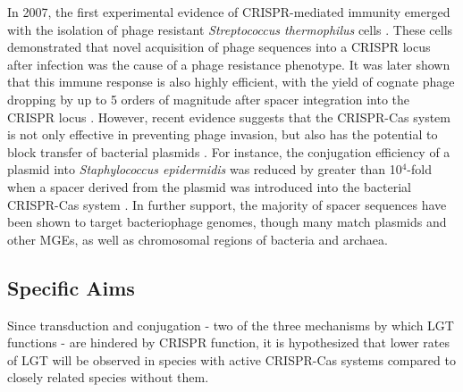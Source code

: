 \documentclass[english]{article}
\newcommand{\cs}[0]{CRISPR-Cas }
\begin{document}
In 2007, the first experimental evidence of CRISPR-mediated immunity
emerged with the isolation of phage resistant \textit{Streptococcus
thermophilus} cells \citep{Barr:07}. These cells demonstrated that novel
acquisition of phage sequences into a CRISPR locus after infection was
the cause of a phage resistance phenotype. It was later shown that this
immune response is also highly efficient, with the yield of cognate phage
dropping by up to 5 orders of magnitude after spacer integration into the
CRISPR locus \citep{Koon:15}. However, recent evidence suggests that the
\cs system is not only effective in preventing phage invasion, but also
has the potential to block transfer of bacterial plasmids
\citep{Bond:14}. For instance,
the conjugation efficiency of a plasmid into \textit{Staphylococcus
epidermidis} was reduced by greater than 10$^4$-fold when a spacer
derived from the plasmid was introduced into the bacterial \cs system
\citep{Bond:14}. In further support, the majority of spacer sequences
have been shown to target bacteriophage genomes, though many match
plasmids and other MGEs, as well as chromosomal regions of bacteria
and archaea. 

\subsection{Specific Aims}

Since transduction and conjugation - two of the three mechanisms by
which LGT functions - are hindered by CRISPR function, it is
hypothesized that lower rates of LGT will be observed in species with
active CRISPR-Cas systems compared to closely related species without
them.
\end{document}
